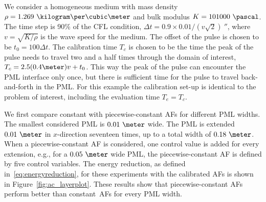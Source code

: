 \documentclass[a4paper]{article}
\begin{document}
We consider a homogeneous medium with mass density $\rho =
1.269~\kilogram\per\cubic\meter$ and bulk modulus $K =
101000~\pascal$. The time step is 90\% of the CFL condition, $\Delta t
= 0.9 \times 0.01/(v\sqrt{2})~\second$, where $v = \sqrt{K/\rho}$ is
the wave speed for the medium.  The offset of the pulse is chosen to
be $t_0 = 100\Delta t$. The calibration time $T_{c}$ is chosen to be
the time the peak of the pulse needs to travel two and a half times
through the domain of interest, $T_{c} = 2.5(0.4\meter)v + t_{0}$.
This way the peak of the pulse can encounter the PML interface only
once, but there is sufficient time for the pulse to travel
back-and-forth in the PML. For this example the calibration set-up is
identical to the problem of interest, including the evaluation time
$T_{e} = T_{c}$.

We first compare constant with piecewise-constant AFs for different
PML widths. The smallest considered PML is $0.01~\meter$ wide. The PML
is extended $0.01~\meter$ in $x$-direction seventeen times, up to a
total width of $0.18~\meter$. When a piecewise-constant AF is
considered, one control value is added for every extension, e.g., for
a $0.05~\meter$ wide PML, the piecewise-constant AF is defined by five
control variables. The energy reduction, as defined
in~\eqref{eq:energyreduction}, for these experiments with the
calibrated AFs is shown in Figure~\ref{fig:ac_layerplot}. These
results show that piecewise-constant AFs perform better than
constant~AFs for every PML width.
\end{document}
